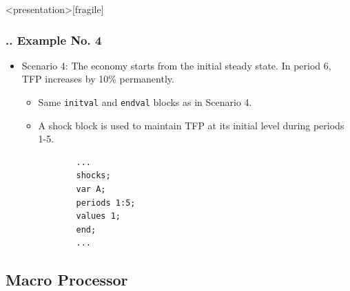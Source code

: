 \documentclass[11pt,aspectratio=169]{beamer}
\begin{document}
\begin{frame}<presentation>[fragile]
	\frametitle{{\thesection.\thesubsection.\thesubsubsection} Example No. 4}
	\begin{itemize}
		\item Scenario 4: The economy starts from the initial steady state. In period 6, TFP increases by 10\% permanently. 
			\begin{itemize}
				\item Same \texttt{initval} and \texttt{endval} blocks as in Scenario 4.
				\item A shock block is used to maintain TFP at its initial level during periods 1-5.
			\end{itemize}
		\begin{verbatim}
		   ...
		   shocks;
		   var A;
		   periods 1:5;
		   values 1;
		   end;
		   ...
		\end{verbatim}
	\end{itemize}
\end{frame}

\subsection{Macro Processor}
\end{document}
